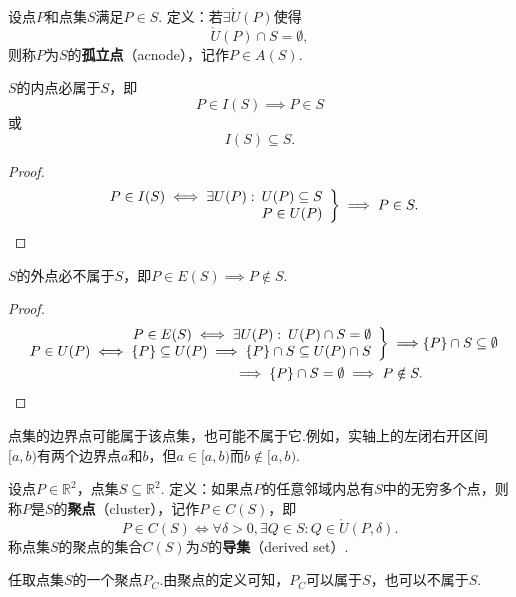 \begin{definition}
设点\(P\)和点集\(S\)满足\(P \in S\).
定义：若\(\exists \mathring{U}(P)\)使得\[
\mathring{U}(P) \cap S = \emptyset,
\]则称\(P\)为\(S\)的\textbf{孤立点}（acnode），记作\(P \in A(S)\).
\end{definition}

\begin{property}
\(S\)的内点必属于\(S\)，即\[
P \in I(S) \implies P \in S
\]或\[
I(S) \subseteq S.
\]
\begin{proof}
\[
\left. \begin{array}{r}
P \in I(S) \iff \exists U(P) :\: U(P) \subseteq S \\
P \in U(P)
\end{array} \right\}
\implies P \in S.
\qedhere
\]
\end{proof}
\end{property}

\begin{property}
\(S\)的外点必不属于\(S\)，即\(P \in E(S) \implies P \notin S\).
\begin{proof}
\begin{align*}
\left. \begin{array}{r}
P \in E(S) \iff \exists U(P) :\: U(P) \cap S = \emptyset \\
P \in U(P) \iff \{P\} \subseteq U(P) \implies \{P\} \cap S \subseteq U(P) \cap S
\end{array} \right\}
\implies& \{P\} \cap S \subseteq \emptyset \\
\implies \{P\} \cap S = \emptyset
\implies P \notin S.&
\qedhere
\end{align*}
\end{proof}
\end{property}

\begin{example}
点集的边界点可能属于该点集，也可能不属于它.例如，实轴上的左闭右开区间\([a,b)\)有两个边界点\(a\)和\(b\)，但\(a \in [a,b)\)而\(b \notin [a,b)\).
\end{example}

\begin{definition}
设点\(P\in\mathbb{R}^2\)，点集\(S\subseteq\mathbb{R}^2\).
定义：如果点\(P\)的任意邻域内总有\(S\)中的无穷多个点，则称\(P\)是\(S\)的\textbf{聚点}（cluster），记作\(P \in C(S)\)，即\[
P \in C(S)
\iff
\forall\delta>0,\exists Q \in S : Q \in \mathring{U}(P,\delta).
\]称点集\(S\)的聚点的集合\(C(S)\)为\(S\)的\textbf{导集}（derived set）.
\end{definition}
任取点集\(S\)的一个聚点\(P_C\).由聚点的定义可知，\(P_C\)可以属于\(S\)，也可以不属于\(S\).


